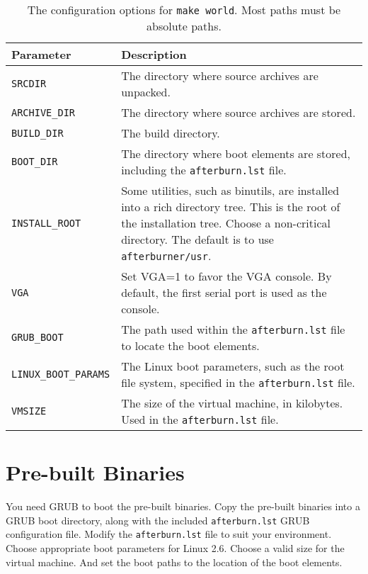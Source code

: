 \documentclass[twoside,a4paper]{report}
\newcommand{\code}[1]{{\tt #1}}
\begin{document}
\begin{table}[hbt]
  \centering
  \begin{tabular}{l|p{6cm}}
  Parameter & Description \\
  \hline
  \code{SRCDIR} & The directory where source archives are unpacked. \\
  \code{ARCHIVE\_DIR} & The directory where source archives are stored.  \\
  \code{BUILD\_DIR} & The build directory. \\
  \code{BOOT\_DIR} & The directory where boot elements are stored,
  including the \code{afterburn.lst} file. \\
  \code{INSTALL\_ROOT} & Some utilities, such as binutils, are
  installed into a rich directory tree.  This is the root of the
  installation tree. Choose a non-critical directory.  The default is
  to use \code{afterburner/usr}. \\
  \code{VGA} & Set VGA=1 to favor the VGA console.  By default, the
  first serial port is used as the console. \\
  \code{GRUB\_BOOT} & The path used within the \code{afterburn.lst}
  file to locate the boot elements. \\
  \code{LINUX\_BOOT\_PARAMS} & The Linux boot parameters, such as the
  root file system, specified in the \code{afterburn.lst} file.  \\
  \code{VMSIZE} & The size of the virtual machine, in kilobytes.  Used
  in the \code{afterburn.lst} file. \\
  \end{tabular}
  \caption{\label{t:world_options}The configuration options for
  \code{make world}.  Most paths must be absolute paths.}
\end{table}

\section{Pre-built Binaries}

You need GRUB to boot the pre-built binaries.  Copy the pre-built
binaries into a GRUB boot directory, along with the included
\code{afterburn.lst} GRUB configuration file.  Modify the
\code{afterburn.lst} file to suit your environment.  Choose
appropriate boot parameters for Linux 2.6.  Choose a valid size for
the virtual machine.  And set the boot paths to the location of the
boot elements.


%
%
\end{document}
